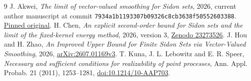 \documentclass[11pt]{article}
\begin{document}
\begin{thebibliography}{9}
 J. Akwei, \emph{The limit of vector-valued smoothing for Sidon
sets}, 2026, current author manuscript at commit
\texttt{7934a1b1193307b09326c8cb3638f50552603388}.
\href{https://raw.githubusercontent.com/johnakwei/Science/7934a1b1193307b09326c8cb3638f50552603388/The_limit_of_vector-valued_smoothing_for_Sidon_sets.pdf}{Pinned original}.
 H. Chen, \emph{An explicit second-order bound for Sidon sets
and the limit of the fixed-kernel energy method},
2026, version 3, \href{https://doi.org/10.5281/zenodo.23273526}{Zenodo 23273526}.
 J. Hou and H. Zhao, \emph{An Improved Upper Bound for Finite Sidon
Sets via Vector-Valued Smoothing}, 2026,
\href{https://arxiv.org/abs/2607.01169v3}{arXiv:2607.01169v3}.
 T. Kuna, J. L. Lebowitz and E. R. Speer,
\emph{Necessary and sufficient conditions for realizability of point
processes}, Ann. Appl. Probab. 21 (2011), 1253--1281,
\href{https://doi.org/10.1214/10-AAP703}{doi:10.1214/10-AAP703}.
\end{thebibliography}
\end{document}
